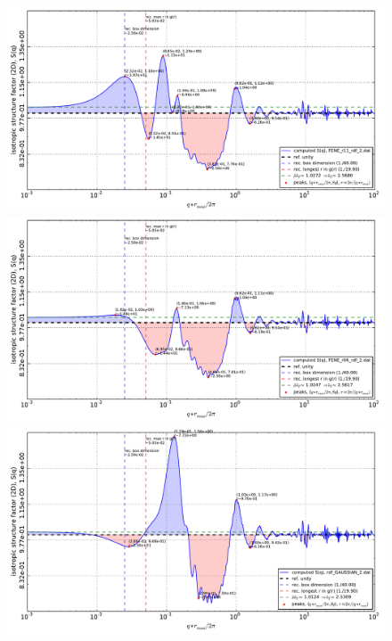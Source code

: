 \documentclass[10pt, a4paper]{article}
\begin{document}
\begin{appendices}

    \begin{figure}
      \centering
      \includegraphics[height=0.3\textheight]{figures/Sq_FENE_r11_2.pdf}\\
      \includegraphics[height=0.3\textheight]{figures/Sq_FENE_r06_2.pdf}\\
      \includegraphics[height=0.3\textheight]{figures/Sq_GAUSSIAN_2.pdf}

\end{figure}
\end{appendices}
\end{document}
